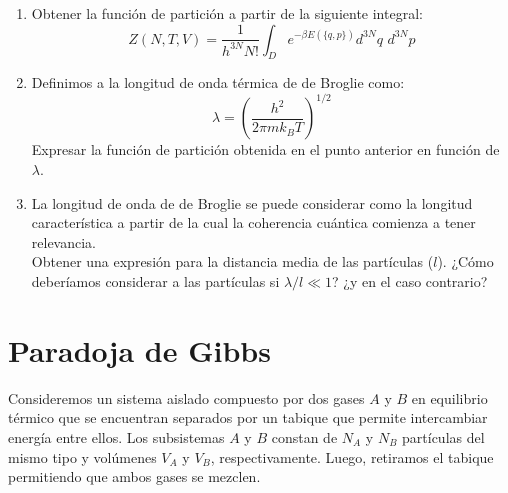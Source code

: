 \documentclass[a4paper,11pt]{article}
\begin{document}
\begin{enumerate}[label=(\alph*),
                  leftmargin=2\parindent,
                  rightmargin=2\parindent]

    \item{\label{item:de-broglie-particion}
          Obtener la función de partición a partir de la siguiente
          integral:
          $$
          Z(N, T, V) =
            \frac{1}{h^{3N} N!}
            \int_D e^{-\beta E(\{q, p\})} d^{3N}q \,\, d^{3N}p
          $$
          }

    \item{Definimos a la longitud de onda térmica de de Broglie como:
          $$ \lambda = \left( \frac{h^2}{2\pi m k_B T} \right)^{1/2} $$
          Expresar la función de partición obtenida en el punto
          anterior en función de $\lambda$.
          }

    \item{La longitud de onda de de Broglie se puede considerar como la
          longitud característica a partir de la cual la coherencia
          cuántica comienza a tener relevancia.\\
          Obtener una expresión para la distancia media de las
          partículas ($l$). ¿Cómo deberíamos considerar a las
          partículas si $\lambda/l \ll 1$? ¿y en el caso contrario?
          }

\end{enumerate}


\section{Paradoja de Gibbs}

Consideremos un sistema aislado compuesto por dos gases $A$ y $B$ en
equilibrio térmico que se encuentran separados por un tabique que
permite intercambiar energía entre ellos.
Los subsistemas $A$ y $B$ constan de $N_A$ y $N_B$ partículas del mismo
tipo y volúmenes $V_A$ y $V_B$, respectivamente.
Luego, retiramos el tabique permitiendo que ambos gases se mezclen.
\end{document}
